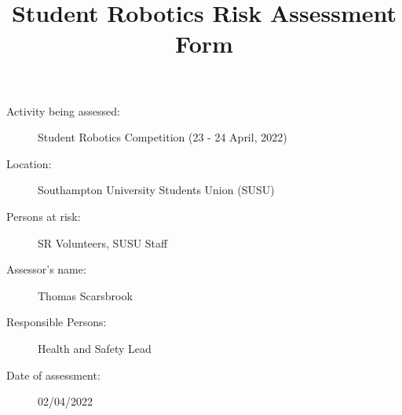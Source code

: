 \documentclass[12pt,a4paper]{scrartcl}
\title{Student Robotics Risk Assessment Form}
\begin{document}
\maketitle

\begin{description}
\item[Activity being assessed:] Student Robotics Competition (23 - 24 April, 2022)
\item[Location:] Southampton University Students Union (SUSU)
\item[Persons at risk:] SR Volunteers, SUSU Staff
\end{description}

\begin{description}
\item[Assessor's name:] Thomas Scarsbrook
\item[Responsible Persons:] Health and Safety Lead
\item[Date of assessment:] 02/04/2022
\end{description}
\clearpage

\renewcommand{\cellalign}{tl}
\renewcommand{\theadalign}{tl}

\newcommand{\risk}[4]{
	#1 & #2 & #3 & #4 \\
}
\end{document}
